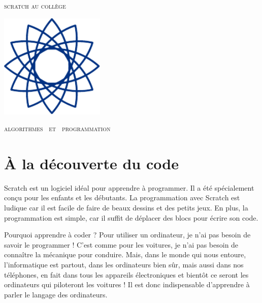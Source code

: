 
\pagestyle{empty}\thispagestyle{empty}
\vspace*{\fill}
\begin{center}
\fontsize{52}{52}\selectfont
\textsc{scratch au collège}

  \hfil
  
  \includegraphics[width = 5cm]{logoScratchAuCollege3}
\end{center}
\vfill
\begin{center}
\huge
\textsc{algorithmes \  et \  programmation}
\end{center}
\begin{center}
\end{center}
\clearemptydoublepage

\thispagestyle{empty}

\vspace*{\fill}
\vspace*{-5ex}

\section*{À la découverte du code}

\vspace*{-2ex}

Scratch est un logiciel idéal pour apprendre à programmer. Il a été spécialement conçu pour les enfants et les débutants. La programmation avec Scratch est ludique car il est facile de faire de beaux dessins et des petits jeux. En plus, la programmation est simple, car il suffit de déplacer des blocs pour écrire son code.

\smallskip 

Pourquoi apprendre à coder ? Pour utiliser un ordinateur, je n'ai pas besoin de savoir le programmer ! C'est comme pour les voitures, je n'ai pas besoin de connaître la mécanique pour conduire. Mais, dans le monde qui nous entoure, l'informatique est partout, dans les ordinateurs bien sûr, mais aussi dans nos téléphones, en fait dans tous les appareils électroniques et bientôt ce seront les ordinateurs qui piloteront les voitures ! Il est donc indispensable d'apprendre à parler le langage des ordinateurs. 


